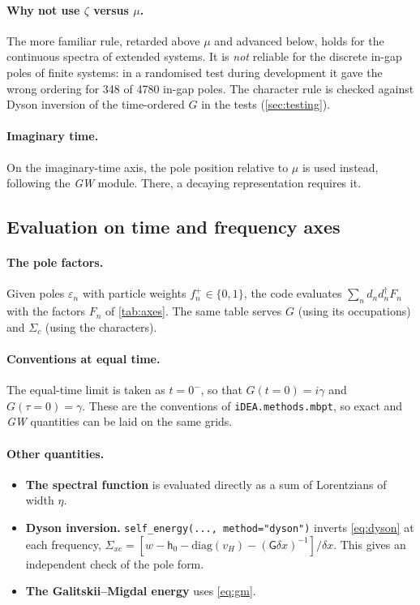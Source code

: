 \documentclass[11pt,a4paper]{article}
\newcommand{\GW}{\textit{GW}}
\newcommand{\code}[1]{\texttt{#1}}
\newcommand{\dx}{\delta x}
\newcommand{\mat}[1]{\mathsf{#1}}
\begin{document}
\paragraph{Why not use $\zeta$ versus $\mu$.} The more familiar rule, retarded above $\mu$ and advanced below, holds for the continuous spectra of extended systems. It is \emph{not} reliable for the discrete in-gap poles of finite systems: in a randomised test during development it gave the wrong ordering for 348 of 4780 in-gap poles. The character rule is checked against Dyson inversion of the time-ordered $G$ in the tests (\cref{sec:testing}).

\paragraph{Imaginary time.} On the imaginary-time axis, the pole position relative to $\mu$ is used instead, following the \GW{} module. There, a decaying representation requires it.

\subsection{Evaluation on time and frequency axes}
\label{sec:axes}

\paragraph{The pole factors.} Given poles $\varepsilon_n$ with particle weights $f^+_n\in\{0,1\}$, the code evaluates $\sum_n d_n d_n^\dagger F_n$ with the factors $F_n$ of \cref{tab:axes}. The same table serves $G$ (using its occupations) and $\Sigma_c$ (using the characters).

\paragraph{Conventions at equal time.} The equal-time limit is taken as $t=0^-$, so that $G(t{=}0)=i\gamma$ and $G(\tau{=}0)=\gamma$. These are the conventions of \code{iDEA.methods.mbpt}, so exact and \GW{} quantities can be laid on the same grids.

\paragraph{Other quantities.}
\begin{itemize}
\item \textbf{The spectral function} is evaluated directly as a sum of Lorentzians of width $\eta$.
\item \textbf{Dyson inversion.} \code{self\_energy(..., method="dyson")} inverts \cref{eq:dyson} at each frequency, $\Sigma_{xc} = [w - \mat h_0 - \mathrm{diag}(v_H) - (\mat G\dx)^{-1}]/\dx$. This gives an independent check of the pole form.
\item \textbf{The Galitskii--Migdal energy} uses \cref{eq:gm}.
\end{itemize}
\end{document}

